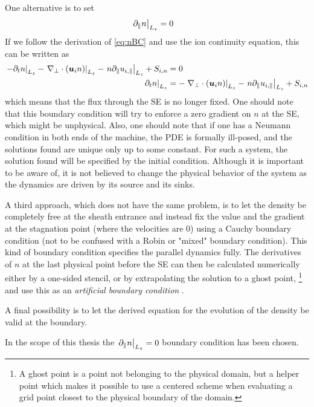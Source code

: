 One alternative is to set
%
\begin{align*}
    \left. \partial_\| n \right|_{L_z} &= 0
\end{align*}
%
If we follow the derivation of \cref{eq:nBC} and use the ion continuity equation, this can be written as
%
\begin{align*}
    \left.- \partial_tn \right|_{L_z}- \left.\nabla_\perp\cdot\left(\boldsymbol{u}_{i} n \right)\right|_{L_z}
    -\left.n \partial_\| u_{i,\|}\right|_{L_z} + S_{i,n}
    &= 0\\
    \left.\partial_tn \right|_{L_z}&=  - \left.\nabla_\perp\cdot\left(\boldsymbol{u}_{i} n \right)\right|_{L_z}-
    \left.n \partial_\| u_{i,\|}\right|_{L_z} + S_{i,n}
\end{align*}
%
which means that the flux through the SE is no longer fixed.
One should note that this boundary condition will try to enforce a zero gradient on $n$ at the SE, which might be unphysical.
Also, one should note that if one has a Neumann condition in both ends of the machine, the PDE is formally ill-posed, and the solutions found are unique only up to some constant.
For such a system, the solution found will be specified by the initial condition.
Although it is important to be aware of, it is not believed to change the physical behavior of the system as the dynamics are driven by its source and its sinks.

A third approach, which does not have the same problem, is to let the density be completely free at the sheath entrance and instead fix the value and the gradient at the stagnation point (where the velocities are $0$) using a Cauchy boundary condition (not to be confused with a Robin or "mixed" boundary condition).
This kind of boundary condition specifies the parallel dynamics fully.
The derivatives of $n$ at the last physical point before the SE can then be calculated numerically either by a one-sided stencil, or by extrapolating the solution to a ghost point,%
%
\footnote{A ghost point is a point not belonging to the physical domain, but a helper point which makes it possible to use a centered scheme when evaluating a grid point closest to the physical boundary of the domain.}
%
and use this as an \emph{artificial boundary condition} \cite{Leveque2007book}.

A final possibility is to let the derived equation for the evolution of the density be valid at the boundary.

In the scope of this thesis the $\left. \partial_\| n \right|_{L_z} = 0$ boundary condition has been chosen.

